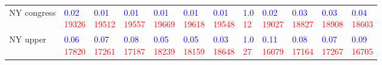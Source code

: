\begin{tabular}{llllllllllll}
NY congress &  \makecell{\textcolor{blue}{0.02} \\ \textcolor{red}{19326}} &  \makecell{\textcolor{blue}{0.01} \\ \textcolor{red}{19512}} &  \makecell{\textcolor{blue}{0.01} \\ \textcolor{red}{19557}} &  \makecell{\textcolor{blue}{0.01} \\ \textcolor{red}{19669}} &  \makecell{\textcolor{blue}{0.01} \\ \textcolor{red}{19618}} &  \makecell{\textcolor{blue}{0.01} \\ \textcolor{red}{19548}} &    \makecell{\textcolor{blue}{1.0} \\ \textcolor{red}{12}} &  \makecell{\textcolor{blue}{0.02} \\ \textcolor{red}{19027}} &  \makecell{\textcolor{blue}{0.03} \\ \textcolor{red}{18827}} &  \makecell{\textcolor{blue}{0.03} \\ \textcolor{red}{18908}} &  \makecell{\textcolor{blue}{0.04} \\ \textcolor{red}{18603}} \\
NY upper    &  \makecell{\textcolor{blue}{0.06} \\ \textcolor{red}{17820}} &  \makecell{\textcolor{blue}{0.07} \\ \textcolor{red}{17261}} &  \makecell{\textcolor{blue}{0.08} \\ \textcolor{red}{17187}} &  \makecell{\textcolor{blue}{0.05} \\ \textcolor{red}{18239}} &  \makecell{\textcolor{blue}{0.05} \\ \textcolor{red}{18159}} &  \makecell{\textcolor{blue}{0.03} \\ \textcolor{red}{18648}} &    \makecell{\textcolor{blue}{1.0} \\ \textcolor{red}{27}} &  \makecell{\textcolor{blue}{0.11} \\ \textcolor{red}{16079}} &  \makecell{\textcolor{blue}{0.08} \\ \textcolor{red}{17164}} &  \makecell{\textcolor{blue}{0.07} \\ \textcolor{red}{17267}} &  \makecell{\textcolor{blue}{0.09} \\ \textcolor{red}{16705}} \\

\end{tabular}
